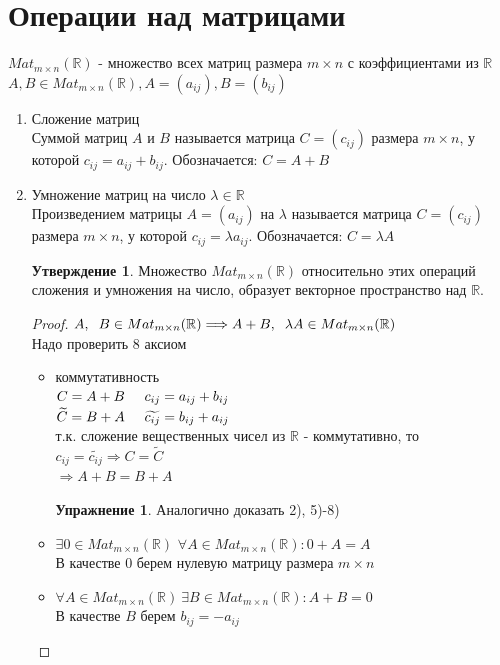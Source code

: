 \documentclass[a4paper, 12pt]{article}
\newcommand{\R}{\mathbb R}
\newcommand\tab[1][.5cm]{\hspace*{#1}}
\theoremstyle{definition}
\newtheorem*{subtheorem}{Утверждение}
\newtheorem*{lalala}{Упражнение}
\begin{document}
  \section{Операции над матрицами}
  $Mat_{m \times n}(\R)$ - множество всех матриц размера $m \times n$ с коэффициентами из $\R$ \\
  $A, B \in Mat_{m \times n}(\R), A=(a_{ij}), B=(b_{ij})$ 
  \begin{enumerate}
    \item Сложение матриц \\
    Суммой матриц $A$ и $B$ называется матрица $C=(c_{ij})$ размера $m \times n$, у которой $c_{ij} = a_{ij} + b_{ij}$. Обозначается: $C = A + B$
    \item Умножение матриц на число $\lambda \in \R$ \\ Произведением матрицы $A=(a_{ij})$ на $\lambda$ называется матрица $C=(c_{ij})$ размера $m \times n$, у которой $c_{ij} = \lambda a_{ij}$. Обозначается: $C = \lambda A$
    \begin{subtheorem}
      Множество $Mat_{m \times n}(\R)$ относительно этих операций сложения и умножения на число, образует векторное пространство над $\R$. 
    \end{subtheorem} 
    \begin{proof}
      $A,\tab [0.2cm]B \in Mat_{m \times n}(\R) \Longrightarrow A+B, \tab [0.2cm]\lambda A \in Mat_{m \times n}(\R)$ \\
      Надо проверить 8 аксиом
      \begin{itemize}
        \item[1)] коммутативность \\
        $C = A + B \tab[0.5cm] c_{ij} = a_{ij} + b_{ij}$ \\
        $\widetilde{C} = B + A \tab[0.5cm] \widetilde{c_{ij}} = b_{ij} + a_{ij}$ \\
        т.к. сложение вещественных чисел из $\R$ - коммутативно, то $c_{ij} = \widetilde{c_{ij}} \Longrightarrow C = \widetilde{C}$ \\
        $\Longrightarrow A + B = B + A$
        \begin{lalala} Аналогично доказать 2), 5)-8)\end{lalala}
        \item[3)] $\exists 0 \in Mat_{m \times n}(\R)$
        $\forall A \in Mat_{m \times n}(\R): 0 + A = A$ \\
        В качестве 0 берем нулевую матрицу размера $m \times n$
        \item[4)] $\forall A \in Mat_{m \times n}(\R) \ \exists B \in Mat_{m \times n}(\R): A+B=0$ \\В качестве $B$ берем $b_{ij} = -a_{ij}$ 

\end{itemize}
\end{proof}
\end{enumerate}
\end{document}
